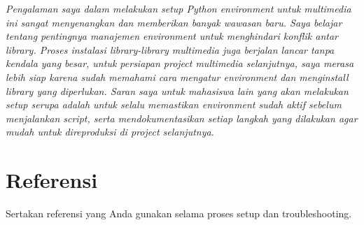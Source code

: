 \documentclass[11pt,a4paper]{article}
\begin{document}
\textit{Pengalaman saya dalam melakukan setup Python environment untuk multimedia ini sangat menyenangkan dan memberikan banyak wawasan baru. Saya belajar tentang pentingnya manajemen environment untuk menghindari konflik antar library. Proses instalasi library-library multimedia juga berjalan lancar tanpa kendala yang besar, untuk persiapan project multimedia selanjutnya, saya merasa lebih siap karena sudah memahami cara mengatur environment dan menginstall library yang diperlukan. Saran saya untuk mahasiswa lain yang akan melakukan setup serupa adalah untuk selalu memastikan environment sudah aktif sebelum menjalankan script, serta mendokumentasikan setiap langkah yang dilakukan agar mudah untuk direproduksi di project selanjutnya.}

\section{Referensi}
Sertakan referensi yang Anda gunakan selama proses setup dan troubleshooting.

\newpage


\nocite{chatgpt-conda-venv-uv}
\end{document}
